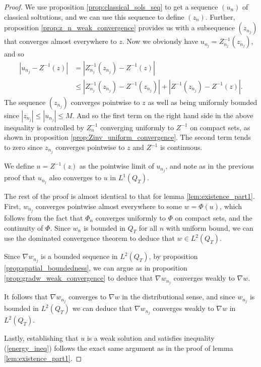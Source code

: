 \documentclass[11pt, a4paper]{article}
\begin{document}
\begin{proof}
We use proposition \ref{prop:classical_sols_seq} to get a sequence $(u_n)$ of classical soltutions, and we can use this sequence to define $(z_n)$. Further, proposition \ref{prop:z_n_weak_convergence} provides us with a subsequence $(z_{n_j})$ that converges almost everywhere to $z$.
Now we obviously have $u_{n_j} = Z_{n_j}^{-1}(z_{n_j})$, and so
\begin{align*}
|u_{n_j} - Z^{-1}(z)| &= |Z_{n_j}^{-1}(z_{n_j}) - Z^{-1}(z)| \\
&\leq |Z_{n_j}^{-1}(z_{n_j}) - Z^{-1}(z_{n_j})| + |Z^{-1}(z_{n_j})- Z^{-1}(z)|.
\end{align*}
The sequence $(z_{n_j})$ converges pointwise to $z$ as well as being uniformly bounded 
since $|z_{n_j}| \leq |u_{n_j}| \leq M$. And so the first term on the right hand side in the above inequality is controlled by $Z_n^{-1}$ converging uniformly to $Z^{-1}$ on compact sets, as shown in proposition \ref{prop:Zinv_uniform_convergence}. The second term tends to zero since $z_{n_j}$ converges pointwise to $z$ and $Z^{-1}$ is continuous.

We define $u=Z^{-1}(z)$ as the pointwise limit of $u_{n_j}$, and note as in the previous proof that $u_{n_j}$ also converges to $u$ in $L^1(Q_T)$.

The rest of the proof is almost identical to that for lemma \ref{lem:existence_part1}. First, $w_{n_j}$ converges pointwise almost everywhere to some $w = \Phi(u)$, which follows from the fact that $\Phi_n$ converges uniformly to $\Phi$ on compact sets, and the continuity of $\Phi$. Since $w_{n}$ is bounded in $Q_T$ for all $n$ with uniform bound, we can use the dominated convergence theorem to deduce that  $w \in L^2(Q_T)$.

Since $\nabla w_{n_j}$ is a bounded sequence in $L^2(Q_T)$, by proposition \ref{prop:spatial_boundedness}, we can argue as in proposition \ref{prop:gradw_weak_convergence} to deduce that $\nabla w_{n_j}$ converges weakly to $\nabla w$.

It follows that $\nabla w_{n_j}$ converges to $\nabla w$ in the distributional sense, and since $w_{n_j}$ is bounded in $L^2(Q_T)$ we can deduce that $\nabla w_{n_j}$ converges weakly to $\nabla w$ in $L^2(Q_T)$.


Lastly, establishing that $u$ is a weak solution and satisfies inequality (\ref{energy_ineq}) follows the exact same argument as in the proof of lemma \ref{lem:existence_part1}.
\end{proof}
\end{document}
